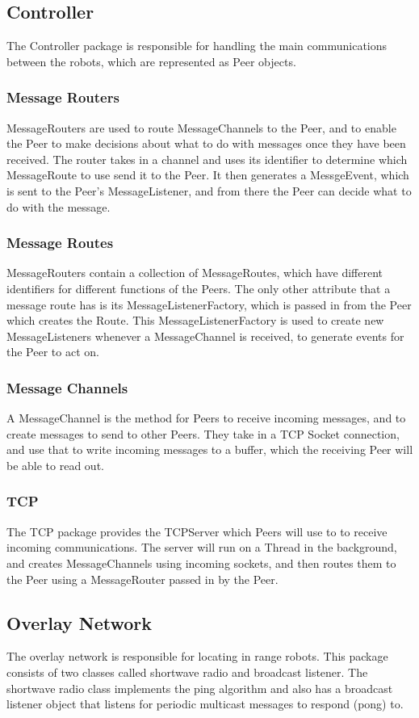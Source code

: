 \documentclass[10pt,letterpaper]{article}
\begin{document}
\subsection{Controller}
The Controller package is responsible for handling the main communications between the robots, which are represented as Peer objects.
    \subsubsection{Message Routers}
    MessageRouters are used to route MessageChannels to the Peer, and to enable the Peer to make decisions about what to do with messages once they have been received. The router takes in a channel and uses its identifier to determine which MessageRoute to use send it to the Peer. It then generates a MessgeEvent, which is sent to the Peer's MessageListener, and from there the Peer can decide what to do with the message.
    \subsubsection{Message Routes}
    MessageRouters contain a collection of MessageRoutes, which have different identifiers for different functions of the Peers. The only other attribute that a message route has is its MessageListenerFactory, which is passed in from the Peer which creates the Route. This MessageListenerFactory is used to create new MessageListeners whenever a MessageChannel is received, to generate events for the Peer to act on. 
    \subsubsection{Message Channels}
    A MessageChannel is the method for Peers to receive incoming messages, and to create messages to send to other Peers. They take in a TCP Socket connection, and use that to write incoming messages to a buffer, which the receiving Peer will be able to read out.  
    \subsubsection{TCP}
    The TCP package provides the TCPServer which Peers will use to to receive incoming communications. The server will run on a Thread in the background, and creates MessageChannels using incoming sockets, and then routes them to the Peer using a MessageRouter passed in by the Peer.
\subsection{Overlay Network}
The overlay network is responsible for locating in range robots. This package consists of two classes called shortwave radio and broadcast listener. The shortwave radio class implements the ping algorithm and also has a broadcast listener object that listens for periodic multicast messages to respond (pong) to.
\end{document}
